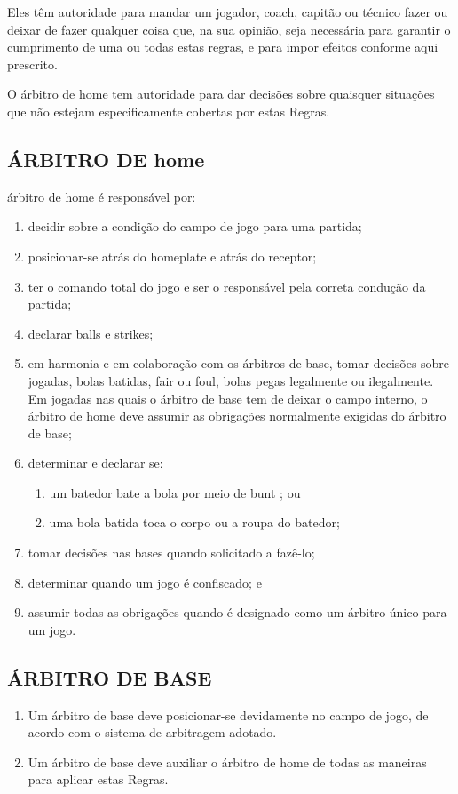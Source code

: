  Eles têm autoridade para mandar um jogador, \gls{coach}, capitão ou técnico fazer ou deixar de fazer qualquer coisa que, na sua  opinião, seja necessária para garantir o cumprimento de uma ou todas estas regras, e para impor efeitos conforme aqui prescrito.

 O árbitro de \gls{home} tem  autoridade para dar decisões sobre quaisquer situações que não estejam  especificamente cobertas por estas Regras.

\subsection{\'ARBITRO DE \gls{home}}

 árbitro de \gls{home} é responsável por:
\begin{enumerate}[label=(\alph*)]
	\item decidir sobre a condição do campo de jogo para uma partida;
	\item posicionar-se atrás do \gls{homeplate} e atrás do receptor;
	\item ter o comando total do jogo e ser o responsável pela correta condução da partida;
	\item declarar \glspl{ball} e \glspl{strike};
	\item em harmonia e em colaboração com os árbitros de base, tomar decisões sobre jogadas, bolas batidas, \gls{fair} ou \gls{foul}, bolas pegas legalmente ou ilegalmente. Em jogadas nas quais o árbitro de base tem de deixar o campo interno, o árbitro de \gls{home} deve assumir as obrigações normalmente exigidas do árbitro de base;
	\item determinar e declarar se:
	 \begin{enumerate}[label=\roman*.]
	 	\item um batedor bate a bola por meio de \gls{bunt} ; ou
		\item uma bola batida toca o corpo ou a roupa do batedor;
	 \end{enumerate}
		\item tomar decisões nas bases quando solicitado a fazê-lo;
		\item determinar quando um jogo é confiscado; e
		\item assumir todas as obrigações quando é designado como um árbitro único para um jogo.
\end{enumerate}

\subsection{ÁRBITRO DE BASE}
\begin{enumerate}[label=(\alph*)]
	\item Um árbitro de base deve posicionar-se devidamente no campo de jogo, de acordo com o sistema de arbitragem adotado.
	\item Um árbitro de base deve auxiliar o árbitro de \gls{home} de todas as maneiras para aplicar estas Regras.
\end{enumerate}

